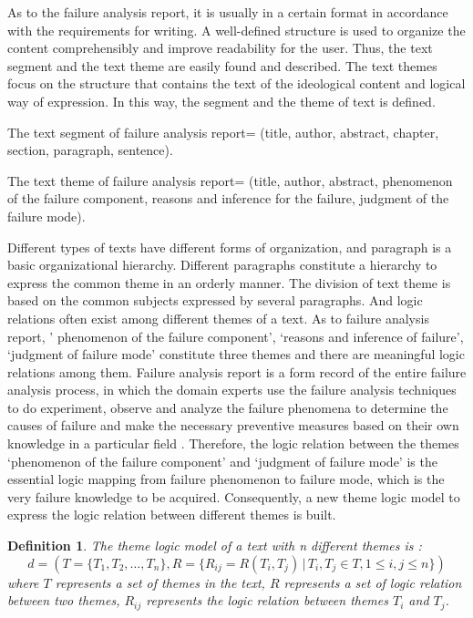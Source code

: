 \documentclass{elsarticle}
\newtheorem{definition}{Definition}
\begin{document}
As to the failure analysis report, it is usually in a certain format
in accordance with the requirements for writing. A well-defined structure is used to organize
the content comprehensibly and improve readability for the user. Thus,
the text segment and the text theme are easily found and
described. The text themes focus on the structure that contains the
text of the ideological content and logical way of expression. In this way, the segment and the theme of text is defined.

\begin{itshape}
  The text segment of failure analysis report= (title, author,
  abstract, chapter, section, paragraph, sentence). 

The text theme of failure analysis report= (title, author, abstract, phenomenon of the failure component, reasons and inference for the failure, judgment of the failure mode).

\end{itshape}

Different types of texts have different forms of
organization, and paragraph is a basic organizational
hierarchy. Different paragraphs constitute a hierarchy to express the
common theme in an orderly manner. The division of text theme is based
on the common subjects expressed by several paragraphs. And logic
relations often exist among different themes of a text. As to
failure analysis report, ' phenomenon of the failure component’, ‘reasons and inference of failure’, ‘judgment of failure mode’ constitute three themes and there are meaningful logic relations among them. Failure analysis report is a form record of the entire failure analysis process, in which the domain experts use the failure analysis techniques to do experiment, observe and analyze the failure phenomena to determine the causes of failure and make the necessary preventive measures based on their own knowledge in a particular field \cite{roberts1980stm}. Therefore, the logic relation between the themes ‘phenomenon of the failure component’ and ‘judgment of failure mode’ is the essential logic mapping from failure phenomenon to failure mode, which is the very failure knowledge to be acquired. Consequently, a new theme logic model to express the logic relation between different themes is built.



\begin{definition}
  The theme logic model of a text with n different themes is :
\[ d = (T = \{T_1,T_2,\ldots,T_n\}, R = \{R_{ij} = R(T_i,T_j) \, | \, T_i,T_j \in
T,1\le i,j \le n \}) \]
where $T$ represents a set of themes in the text, $R$ represents a set of logic relation between two themes, $R_{ij}$ represents the logic relation between themes $T_i$ and $T_j$. 

\end{definition}
\end{document}
